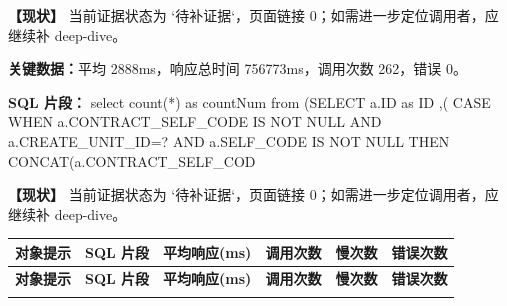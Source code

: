 \noindent\textbf{【现状】} 当前证据状态为 `待补证据`，页面链接 0；如需进一步定位调用者，应继续补 deep-dive。\par

\vspace{0.35em}\par

\noindent\textbf{关键数据：}平均 2888ms，响应总时间 756773ms，调用次数 262，错误 0。\par

\noindent\textbf{SQL 片段：} select count(\allowbreak{}*)\allowbreak{} as countNum from (\allowbreak{}SELECT a.\allowbreak{}ID as ID ,\allowbreak{}(\allowbreak{} CASE WHEN a.\allowbreak{}CONTRACT\allowbreak{}\_\allowbreak{}SELF\allowbreak{}\_\allowbreak{}CODE IS NOT NULL AND a.\allowbreak{}CREATE\allowbreak{}\_\allowbreak{}UNIT\allowbreak{}\_\allowbreak{}ID=\allowbreak{}?\allowbreak{} AND a.\allowbreak{}SELF\allowbreak{}\_\allowbreak{}CODE IS NOT NULL THEN CONCAT(\allowbreak{}a.\allowbreak{}CONTRACT\allowbreak{}\_\allowbreak{}SELF\allowbreak{}\_\allowbreak{}COD\par

\noindent\textbf{【现状】} 当前证据状态为 `待补证据`，页面链接 0；如需进一步定位调用者，应继续补 deep-dive。\par


\setlength{\LTleft}{0pt}
\setlength{\LTright}{0pt}
\setlength{\tabcolsep}{2.8pt}
\renewcommand{\arraystretch}{1.35}
\footnotesize
\begin{longtable}{>{\RaggedRight\arraybackslash}p{}>{\RaggedRight\arraybackslash}p{}>{\RaggedRight\arraybackslash}p{}>{\RaggedRight\arraybackslash}p{}>{\RaggedRight\arraybackslash}p{}>{\RaggedRight\arraybackslash}p{}}
\hline
\cellcolor{HeaderBlue}\color{white}\bfseries 对象提示 & \cellcolor{HeaderBlue}\color{white}\bfseries SQL 片段 & \cellcolor{HeaderBlue}\color{white}\bfseries 平均响应(ms) & \cellcolor{HeaderBlue}\color{white}\bfseries 调用次数 & \cellcolor{HeaderBlue}\color{white}\bfseries 慢次数 & \cellcolor{HeaderBlue}\color{white}\bfseries 错误次数 \\
\hline
\endfirsthead
\hline
\cellcolor{HeaderBlue}\color{white}\bfseries 对象提示 & \cellcolor{HeaderBlue}\color{white}\bfseries SQL 片段 & \cellcolor{HeaderBlue}\color{white}\bfseries 平均响应(ms) & \cellcolor{HeaderBlue}\color{white}\bfseries 调用次数 & \cellcolor{HeaderBlue}\color{white}\bfseries 慢次数 & \cellcolor{HeaderBlue}\color{white}\bfseries 错误次数 \\
\hline
\endhead
\multicolumn{6}{l}{【当前批次未获取到异常SQL主表数据】}\\
\hline
\end{longtable}
\normalsize

